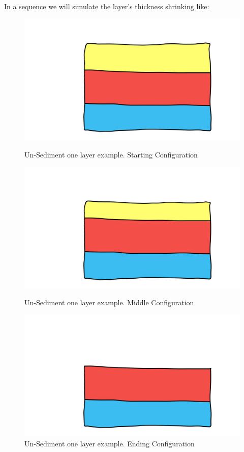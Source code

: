 \documentclass[12pt, a4paper]{memoir} %
\begin{document}
In a sequence we will simulate the layer's thickness shrinking like:
\begin{figure}[h]
    \begin{minipage}[c]{.50\linewidth}
        \centering
        \includegraphics[scale=0.2]{unSedimentDescription0.png}
	\caption{Un-Sediment one layer example. Starting Configuration}
    \end{minipage}
    \hfill%
    \begin{minipage}[c]{.50\linewidth}
        \centering
        \includegraphics[scale=0.2]{unSedimentDescription1.png}
	\caption{Un-Sediment one layer example. Middle Configuration}
    \end{minipage}
     \hfill%
    \begin{minipage}[c]{.50\linewidth}
        \centering
        \includegraphics[scale=0.2]{unSedimentDescription2.png}
	\caption{Un-Sediment one layer example. Ending Configuration}
    \end{minipage}
\end{figure}\\
\end{document}
